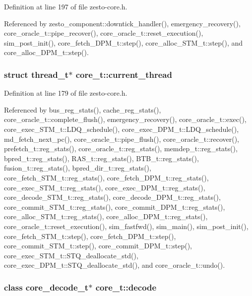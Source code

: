 Definition at line 197 of file zesto-core.h.

Referenced by zesto\_\-component::downtick\_\-handler(), emergency\_\-recovery(), core\_\-oracle\_\-t::pipe\_\-recover(), core\_\-oracle\_\-t::reset\_\-execution(), sim\_\-post\_\-init(), core\_\-fetch\_\-DPM\_\-t::step(), core\_\-alloc\_\-STM\_\-t::step(), and core\_\-alloc\_\-DPM\_\-t::step().
\subsubsection[{current\_\-thread}]{\setlength{\rightskip}{0pt plus 5cm}struct {\bf thread\_\-t}$\ast$ {\bf core\_\-t::current\_\-thread}\hspace{0.3cm}{\tt  [read]}}\label{classcore__t_514a179d7ff004ee9a5c5167d90c2119}




Definition at line 179 of file zesto-core.h.

Referenced by bus\_\-reg\_\-stats(), cache\_\-reg\_\-stats(), core\_\-oracle\_\-t::complete\_\-flush(), emergency\_\-recovery(), core\_\-oracle\_\-t::exec(), core\_\-exec\_\-STM\_\-t::LDQ\_\-schedule(), core\_\-exec\_\-DPM\_\-t::LDQ\_\-schedule(), md\_\-fetch\_\-next\_\-pc(), core\_\-oracle\_\-t::pipe\_\-flush(), core\_\-oracle\_\-t::recover(), prefetch\_\-t::reg\_\-stats(), core\_\-oracle\_\-t::reg\_\-stats(), memdep\_\-t::reg\_\-stats(), bpred\_\-t::reg\_\-stats(), RAS\_\-t::reg\_\-stats(), BTB\_\-t::reg\_\-stats(), fusion\_\-t::reg\_\-stats(), bpred\_\-dir\_\-t::reg\_\-stats(), core\_\-fetch\_\-STM\_\-t::reg\_\-stats(), core\_\-fetch\_\-DPM\_\-t::reg\_\-stats(), core\_\-exec\_\-STM\_\-t::reg\_\-stats(), core\_\-exec\_\-DPM\_\-t::reg\_\-stats(), core\_\-decode\_\-STM\_\-t::reg\_\-stats(), core\_\-decode\_\-DPM\_\-t::reg\_\-stats(), core\_\-commit\_\-STM\_\-t::reg\_\-stats(), core\_\-commit\_\-DPM\_\-t::reg\_\-stats(), core\_\-alloc\_\-STM\_\-t::reg\_\-stats(), core\_\-alloc\_\-DPM\_\-t::reg\_\-stats(), core\_\-oracle\_\-t::reset\_\-execution(), sim\_\-fastfwd(), sim\_\-main(), sim\_\-post\_\-init(), core\_\-fetch\_\-STM\_\-t::step(), core\_\-fetch\_\-DPM\_\-t::step(), core\_\-commit\_\-STM\_\-t::step(), core\_\-commit\_\-DPM\_\-t::step(), core\_\-exec\_\-STM\_\-t::STQ\_\-deallocate\_\-std(), core\_\-exec\_\-DPM\_\-t::STQ\_\-deallocate\_\-std(), and core\_\-oracle\_\-t::undo().
\subsubsection[{decode}]{\setlength{\rightskip}{0pt plus 5cm}class {\bf core\_\-decode\_\-t}$\ast$ {\bf core\_\-t::decode}}\label{classcore__t_5a8f490b74ace2edeb7f90c493c98691}




